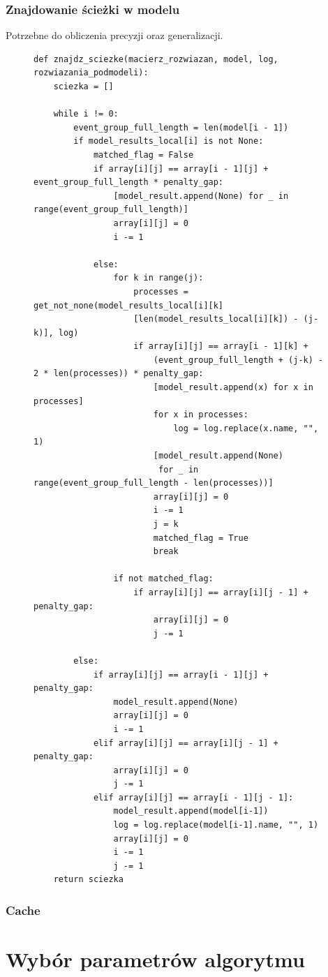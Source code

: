 \subsubsection{Znajdowanie ścieżki w modelu}
Potrzebne do obliczenia precyzji oraz generalizacji.
\begin{figure}[!ht]
\lstset{caption=Znajdowanie ścieżki w modelu, captionpos=b}
\lstset{label=src:traceback, frame=single}
\begin{lstlisting}
def znajdz_sciezke(macierz_rozwiazan, model, log, rozwiazania_podmodeli):
    sciezka = []

    while i != 0:
        event_group_full_length = len(model[i - 1])
        if model_results_local[i] is not None:
            matched_flag = False
            if array[i][j] == array[i - 1][j] + event_group_full_length * penalty_gap:
                [model_result.append(None) for _ in range(event_group_full_length)]
                array[i][j] = 0
                i -= 1

            else:
                for k in range(j):
                    processes = get_not_none(model_results_local[i][k]
                    [len(model_results_local[i][k]) - (j-k)], log)
                    if array[i][j] == array[i - 1][k] + 
                    	(event_group_full_length + (j-k) - 2 * len(processes)) * penalty_gap:
                        [model_result.append(x) for x in processes]
                        for x in processes:
                            log = log.replace(x.name, "", 1)
                        [model_result.append(None) 
                         for _ in range(event_group_full_length - len(processes))]
                        array[i][j] = 0
                        i -= 1
                        j = k
                        matched_flag = True
                        break

                if not matched_flag:
                    if array[i][j] == array[i][j - 1] + penalty_gap:
                        array[i][j] = 0
                        j -= 1

        else:
            if array[i][j] == array[i - 1][j] + penalty_gap:
                model_result.append(None)
                array[i][j] = 0
                i -= 1
            elif array[i][j] == array[i][j - 1] + penalty_gap:
                array[i][j] = 0
                j -= 1
            elif array[i][j] == array[i - 1][j - 1]:
                model_result.append(model[i-1])
                log = log.replace(model[i-1].name, "", 1)
                array[i][j] = 0
                i -= 1
                j -= 1
    return sciezka
\end{lstlisting}
\end{figure}

\subsubsection{Cache}
\section{Wybór parametrów algorytmu}
